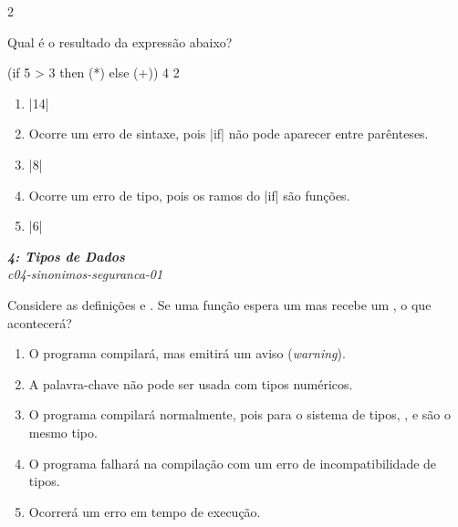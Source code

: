 \documentclass[a4paper,10pt,brazil]{article}
\begin{document}
\begin{multicols}{2}
\begin{flushright}
\end{flushright}
Qual é o resultado da expressão abaixo?
\begin{haskellcode}
(if 5 > 3 then (*) else (+)) 4 2
\end{haskellcode}

\begin{enumerate}
  \item \haskellinline|14|

  \item Ocorre um erro de sintaxe, pois \haskellinline|if| não pode aparecer entre parênteses.

  \item \haskellinline|8|

  \item Ocorre um erro de tipo, pois os ramos do \haskellinline|if| são funções.

  \item \haskellinline|6|


\end{enumerate}

\begin{flushright}
  \footnotesize
  \textit{\textbf{4: Tipos de Dados}}\\
  \textit{c04-sinonimos-seguranca-01}\\

\end{flushright}
Considere as definições  e . Se uma função espera um  mas recebe um , o que acontecerá?

\begin{enumerate}
  \item O programa compilará, mas emitirá um aviso (\emph{warning}).

  \item A palavra-chave  não pode ser usada com tipos numéricos.

  \item O programa compilará normalmente, pois para o sistema de tipos, ,  e  são o mesmo tipo.

  \item O programa falhará na compilação com um erro de incompatibilidade de tipos.

  \item Ocorrerá um erro em tempo de execução.



\end{enumerate}
\end{multicols}
\end{document}

